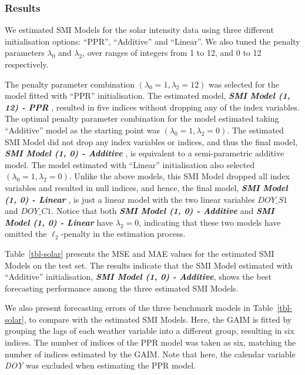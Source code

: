\documentclass[
  11pt,
  a4paper,
]{article}
\begin{document}
\subsubsection{Results}\label{results-1}

We estimated SMI Models for the solar intensity data using three
different initialisation options: ``PPR'', ``Additive'' and ``Linear''.
We also tuned the penalty parameters \(\lambda_{0}\) and
\(\lambda_{2}\), over ranges of integers from 1 to 12, and 0 to 12
respectively.

The penalty parameter combination
\((\lambda_{0} = 1, \lambda_{2} = 12)\) was selected for the model
fitted with ``PPR'' initialisation. The estimated model,
\textbf{\emph{SMI Model (1, 12) - PPR }}, resulted in five indices
without dropping any of the index variables. The optimal penalty
parameter combination for the model estimated taking ``Additive'' model
as the starting point was \((\lambda_{0} = 1, \lambda_{2} = 0)\). The
estimated SMI Model did not drop any index variables or indices, and
thus the final model, \textbf{\emph{SMI Model (1, 0) - Additive }}, is
equivalent to a semi-parametric additive model. The model estimated with
``Linear'' initialisation also selected
\((\lambda_{0} = 1, \lambda_{2} = 0)\). Unlike the above models, this
SMI Model dropped all index variables and resulted in null indices, and
hence, the final model, \textbf{\emph{SMI Model (1, 0) - Linear }}, is
just a linear model with the two linear variables \(DOY\_S1\) and
\(DOY\_C1\). Notice that both \textbf{\emph{SMI Model (1, 0) - Additive
}} and \textbf{\emph{SMI Model (1, 0) - Linear}} have
\(\lambda_{2} = 0\), indicating that these two models have omitted the
\(\ell_{2}\)-penalty in the estimation process.

Table~\ref{tbl-solar} presents the MSE and MAE values for the estimated
SMI Models on the test set. The results indicate that the SMI Model
estimated with ``Additive'' initialisation, \textbf{\emph{SMI Model (1,
0) - Additive}}, shows the best forecasting performance among the three
estimated SMI Models.

We also present forecasting errors of the three benchmark models in
Table~\ref{tbl-solar}, to compare with the estimated SMI Models. Here,
the GAIM is fitted by grouping the lags of each weather variable into a
different group, resulting in six indices. The number of indices of the
PPR model was taken as six, matching the number of indices estimated by
the GAIM. Note that here, the calendar variable \emph{DOY} was excluded
when estimating the PPR model.
\end{document}
